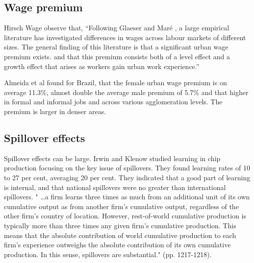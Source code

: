 \subsection{Wage premium} \label{section-wage-premium}

Hirsch Wage \cite{hirschUrbanWagePremium2019} observe that, ``Following Glaeser and Maré \cite{glaeserCitiesSkills2001},  a  large  empirical  literature  has  investigated differences in wages across labour markets of different sizes. The general finding of this literature is that a significant urban wage premium exists. and that this premium consists both of a level effect and a growth effect that arises as workers gain urban work experience.'' 

Almeida et al \cite{almeidaUrbanWagePremium2022} found for Brazil, that the female urban wage premium is on average 11.3\%, almost double the average male premium of 5.7\% and that higher in formal and informal jobs and across various agglomeration levels. The premium is larger in denser areas.

\subsection{Spillover effects} \label{section-spillover}

Spillover effects can be large. Irwin and Klenow  studied learning in chip production focusing  on the key issue of spillovers. They found learning rates of 10 to 27 per cent, averaging 20 per cent. They indicated that a good part of learning is internal, and that national spillovers were no greater than international spillovers. " \dots a firm learns three times as much from an additional unit of its own cumulative output as from another firm's cumulative output, regardless of the other firm's country of location. However, rest-of-world cumulative production is typically more than three times any given firm's cumulative production. This means that the absolute contribution of world cumulative production to each firm's experience outweighs the absolute contribution of its own cumulative production. In this sense, spillovers are substantial." (pp. 1217-1218).



